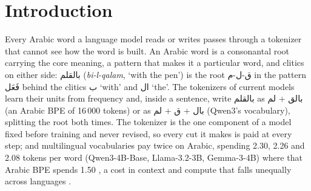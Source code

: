 \providecommand{\tok}[2]{\texttt{[#1\_}\textarabic{#2}\texttt{]}}

\section{Introduction}
\label{sec:intro}

Every Arabic word a language model reads or writes passes through a tokenizer that cannot see how the word is built. An
Arabic word is a consonantal root carrying the core meaning, a pattern that makes it a particular word, and clitics on
either side: \textarabic{بالقلم} (\textit{bi-l-qalam}, `with the pen') is the root \textarabic{ق-ل-م} in the pattern
\textarabic{فَعَل} behind the clitics \textarabic{ب} `with' and \textarabic{ال} `the'. The tokenizers of current models
learn their units from frequency
\citep{sennrich-etal-2016-neural,kudo-richardson-2018-sentencepiece,mielke-2021-tokenization} and, inside a sentence,
write \textarabic{بالقلم} as \textarabic{بالق} + \textarabic{لم} (an Arabic BPE of 16\,000 tokens) or as
\textarabic{بال} + \textarabic{ق} + \textarabic{لم} (Qwen3's vocabulary), splitting the root both times. The tokenizer
is the one component of a model fixed before training and never revised, so every cut it makes is paid at every step;
and multilingual vocabularies pay twice on Arabic, spending 2.30, 2.26 and 2.08 tokens per word (Qwen3-4B-Base,
Llama-3.2-3B, Gemma-3-4B) where that Arabic BPE spends 1.50 \citep[fertility;][]{rust-etal-2021-good}, a cost in context
and compute that falls unequally across languages \citep{petrov-2023-unfairness}.

